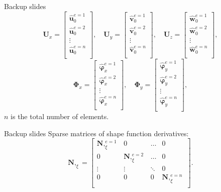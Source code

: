 \documentclass[10pt]{beamer} %
\renewcommand{\vec}[1]{\mathbf{#1}}
\newcommand{\bm}[1]{\mathbf{#1}}
\newcommand{\bs}[1]{\boldsymbol{#1}}
\begin{document}
\begin{frame}{Backup slides}
	\begin{equation*}
	\vec{U}_x = \left[
	\begin{array}{c}  
	\hat{\vec{u}}_0^{e=1}  \\[2pt]
	\hat{\vec{u}}_0^{e=2} \\[2pt]
	\vdots\\[2pt]
	\hat{\vec{u}}_0^{e=n}\\[2pt]
	\end{array}\right],
	\quad
	\vec{U}_y = \left[
	\begin{array}{c}  
	\hat{\vec{v}}_0^{e=1}  \\[2pt]
	\hat{\vec{v}}_0^{e=2} \\[2pt]
	\vdots\\[2pt]
	\hat{\vec{v}}_0^{e=n}\\[2pt]
	\end{array}\right],
	\quad
	\vec{U}_z = \left[
	\begin{array}{c}  
	\hat{\vec{w}}_0^{e=1}  \\[2pt]
	\hat{\vec{w}}_0^{e=2} \\[2pt]
	\vdots\\[2pt]
	\hat{\vec{w}}_0^{e=n}\\[2pt]
	\end{array}\right],
	\end{equation*}
	\begin{equation*}
	\bs{\Phi}_x = \left[
	\begin{array}{c}  
	\hat{\bs{\varphi}}_x^{e=1}  \\[2pt]
	\hat{\bs{\varphi}}_x^{e=2} \\[2pt]
	\vdots\\[2pt]
	\hat{\bs{\varphi}}_x^{e=n}\\[2pt]
	\end{array}\right],
	\quad
	\bs{\Phi}_y = \left[
	\begin{array}{c}  
	\hat{\bs{\varphi}}_y^{e=1}  \\[2pt]
	\hat{\bs{\varphi}}_y^{e=2} \\[2pt]
	\vdots\\[2pt]
	\hat{\bs{\varphi}}_y^{e=n}\\[2pt]
	\end{array}\right],
	\end{equation*}
	$n$ is the total number of elements.\\	
\end{frame}	
\begin{frame}{Backup slides}
	Sparse matrices of shape function derivatives:
	\begin{equation*}
	\bm{N},_{\xi} = \left[
	\begin{array}{cccc}  
	\bm{N},_{\xi}^{e=1} & 0 & \ldots & 0\\[2pt]
	0& \bm{N},_{\xi}^{e=2}  & \ldots& 0\\[2pt]
	\vdots&\vdots&\ddots&0\\[2pt]
	0& 0 &0&\bm{N},_{\xi}^{e=n}\\[2pt]
	\end{array}\right].
	\end{equation*}
\end{frame}
\end{document}
